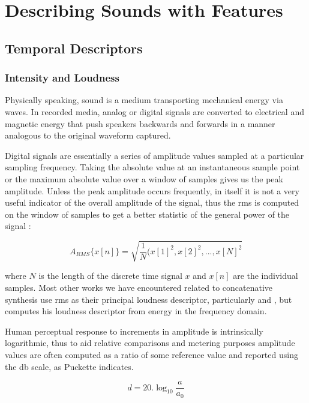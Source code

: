 {{\section{Describing Sounds with Features}

\subsection{Temporal Descriptors}

\subsubsection{Intensity and Loudness}

Physically speaking, sound is a medium transporting mechanical energy via waves. In recorded media, analog or digital signals are converted to electrical and magnetic energy that push speakers backwards and forwards in a manner analogous to the original waveform captured.

Digital signals are essentially a series of amplitude values sampled at a particular sampling frequency. Taking the absolute value at an instantaneous sample point or the maximum absolute value over a window of samples gives us the peak amplitude. Unless the peak amplitude occurs frequently, in itself it is not a very useful indicator of the overall amplitude of the signal, thus the \acrfull{rms} is computed on the window of samples to get a better statistic of the general power of the signal \citep{Puckette2006}:

\begin{equation}
\label{eq:rms}	
A_{RMS}\{x[n]\} = \sqrt{\frac{1}{N}(x[1]^2, x[2]^2,..., x[N]^2}
\end{equation}

where $N$ is the length of the discrete time signal $x$ and $x[n]$ are the individual samples. Most other works we have encountered related to concatenative synthesis use \acrshort{rms} as their principal loudness descriptor, particularly \cite{Sturm2004} and \cite{Bernardes2013}, but \cite{Jehan2005} computes his loudness descriptor from energy in the frequency domain.

Human perceptual response to increments in amplitude is intrinsically logarithmic, thus to aid relative comparisons and metering purposes amplitude values are often computed as a ratio of some reference value and reported using the \acrfull{db} scale, as Puckette \citeyearpar{Puckette2006} indicates. 

\begin{equation}
\label{eq:decibel}	
d = 20.\log_{10}{\frac{a}{a_{0}}}
\end{equation}

}}
